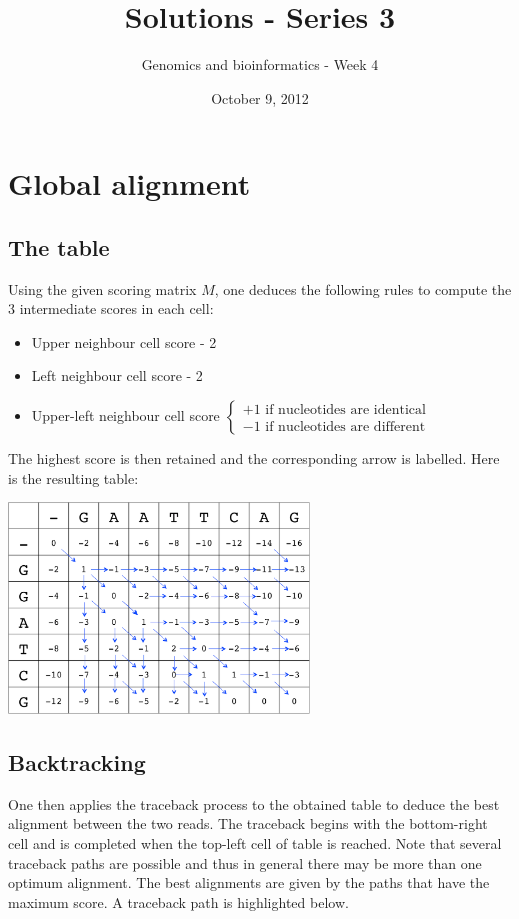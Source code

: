 \documentclass[english, a4paper,11pt]{article}
\title{Solutions - Series 3}
\date{October 9, 2012}
\author{Genomics and bioinformatics - Week 4}
\begin{document}
\maketitle

\section{Global alignment}
\subsection{The table}
\noindent
Using the given scoring matrix $M$, one deduces the following rules to compute the 3 intermediate scores in each cell:
\begin{itemize}
\item Upper neighbour cell score - 2
\item Left neighbour cell score - 2
\item Upper-left neighbour cell score $\left\{\begin{array}{l} +1 \mbox{ if nucleotides are identical} \\ -1 \mbox{ if nucleotides are different}\end{array} \right.$
\end{itemize}
The highest score is then retained and the corresponding arrow is labelled. Here is the resulting table: \\
\begin{center}
\includegraphics[width=0.6\textwidth]{scoring.png}\\
\end{center}

\subsection{Backtracking}
\noindent
One then applies the traceback process to the obtained table to deduce the best alignment between the two reads. 
The traceback begins with the bottom-right cell and is completed when the top-left cell of table is reached. Note that several 
traceback paths are possible and thus in general there may be more than one optimum alignment. The best alignments are given by the paths that have the maximum score. A traceback path is highlighted below.
\end{document}

